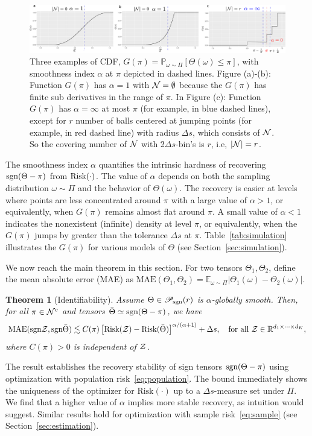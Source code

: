 \documentclass[twoside,11pt]{article}
\theoremstyle{plain}
\newtheorem{thm}{Theorem}
\theoremstyle{definition}
\def\sign{\textup{sgn}}
\def\caliP{\mathscr{P}_{\textup{sgn}}}
\def\risk{\textup{Risk}}
\begin{document}
\begin{figure}
    \centering
    \includegraphics[width = \textwidth]{figure/cdf_new.pdf}
    \caption{Three examples of CDF, $G(\pi) = \mathbb{P}_{\omega\sim\Pi}[\Theta(\omega)\leq \pi]$, with smoothness index $\alpha$ at $\pi$ depicted in dashed lines. Figure (a)-(b): Function $G(\pi)$ has $\alpha = 1$ with $\mathcal{N} = \emptyset$ because the $G(\pi)$ has finite sub derivatives in the range of $\pi$. In Figure (c): Function $G(\pi)$ has $\alpha = \infty$ at most $\pi$ (for example, in blue dashed lines), except for $r$ number of balls centered at jumping points (for example, in red dashed line) with radius $\Delta s$, which consists of $\mathcal{N}$.  So the covering number of $\mathcal{N}$ with 2$\Delta s$-bin's is $r$, i.e, $|\mathcal{N}| = r$. }
    \label{fig:cdf}
\end{figure}


The smoothness index $\alpha$ quantifies the intrinsic hardness of recovering $\sign(\Theta-\pi)$ from $\risk(\cdot)$. 
The value of $\alpha$ depends on both the sampling distribution $\omega\sim \Pi$ and the behavior of $\Theta(\omega)$. 
The recovery is easier at levels where points are less concentrated around $\pi$ with a large value of $\alpha>1$, or equivalently, when $G(\pi)$ remains almost  flat around $\pi$. A small value of $\alpha<1$ indicates the nonexistent (infinite) density at level $\pi$, or equivalently, when the $G(\pi)$ jumps by greater than the tolerance $\Delta s$ at $\pi$. Table~\ref{tab:simulation} illustrates the $G(\pi)$ for various models of $\Theta$ (see Section~\ref{sec:simulation}). 

We now reach the main theorem in this section. For two tensors $\Theta_1,\Theta_2$, define the mean absolute error (MAE) as
$\text{MAE}(\Theta_1, \Theta_2)=\mathbb{E}_{\omega\sim \Pi}|\Theta_1(\omega)-\Theta_2(\omega)|.$

\begin{thm}[Identifiability]\label{thm:population}Assume $\Theta\in\caliP(r)$ is $\alpha$-globally smooth. Then, for all $\pi\in \mathcal{N}^c$ and tensors $\bar \Theta \simeq \sign(\Theta-\pi)$, we have
\[
\textup{MAE}(\sign \tZ, \sign \bar \Theta) \lesssim C(\pi)\left[\textup{Risk}(\tZ)-\textup{Risk}( \bar \Theta)\right]^{\alpha/(\alpha+1)}+\Delta s, \quad \text{for all }\tZ\in\mathbb{R}^{d_1\times \cdots \times d_K},
\]
where $C(\pi)>0$ is independent of $\mathcal{Z}$. 
\end{thm}
The result establishes the recovery stability of sign tensors $\sign (\Theta-\pi)$ using optimization with population risk~\eqref{eq:population}. The bound immediately shows the uniqueness of the optimizer for $\text{Risk}(\cdot)$ up to a  $\Delta s$-measure set under $\Pi$. We find that a higher value of $\alpha$ implies more stable recovery, as intuition would suggest. Similar results hold for optimization with sample risk~\eqref{eq:sample} (see Section~\ref{sec:estimation}). 
\end{document}

